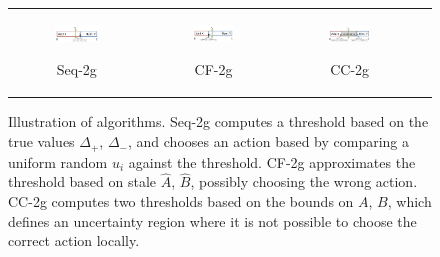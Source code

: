 \documentclass{article} %
\newcommand{\hogwild}{CF-2g}
\newcommand{\occ}{CC-2g}
\newcommand{\seqalg}{Seq-2g}
\begin{document}
\begin{figure}[h]
\begin{multicols}{2}
\begin{minipage}{0.49\textwidth}
    \end{minipage}



  \end{multicols}
  \label{fig:submax}
\end{figure}



\begin{figure}[ht]
  \centering
  \begin{tabular}{cccc}
    \begin{subfigure}[h]{0.30\textwidth}
      \centering
      \includegraphics[width=130pt]{images/probvec_seq.pdf}
      \label{fig:probvecseq}
      \caption{\footnotesize\seqalg{}}
    \end{subfigure} &
    \begin{subfigure}[h]{0.30\textwidth}
      \centering
      \includegraphics[width=130pt]{images/probvec_CF.pdf}
      \label{fig:probveccf}
      \caption{\footnotesize\hogwild{}}
    \end{subfigure} &
    \begin{subfigure}[h]{0.30\textwidth}
      \centering
      \includegraphics[width=130pt]{images/probvec_CC.pdf}
      \label{fig:probveccc}
      \caption{\footnotesize\occ{}}
    \end{subfigure}
  \end{tabular}
  \caption{\footnotesize Illustration of algorithms.
  \seqalg{} computes a threshold based on the true values $\Delta_+$, $\Delta_-$, and chooses an action based by comparing a uniform random $u_i$ against the threshold.
  \hogwild{} approximates the threshold based on stale $\hat{A}$, $\hat{B}$, possibly choosing the wrong action.
  \occ{} computes two thresholds based on the bounds on $A$, $B$, which defines an uncertainty region where it is not possible to choose the correct action locally.
  }
\end{figure}
\end{document}
